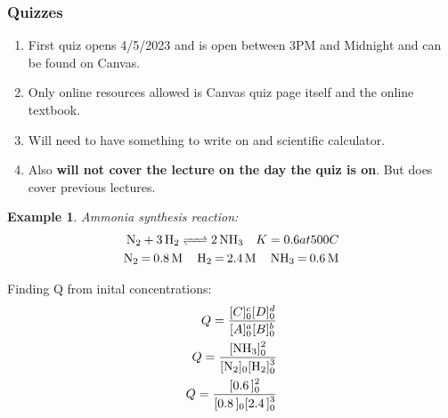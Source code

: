 \documentclass{article}  %
\newtheorem{exmp}{Example}
\begin{document}
\subsubsection*{Quizzes}
\begin{enumerate}
    \item First quiz opens 4/5/2023 and is open between 3PM and Midnight and can be found on Canvas.
    \item Only online resources allowed is Canvas quiz page itself and the online textbook.
    \item Will need to have something to write on and scientific calculator.
    \item Also \textbf{will not cover the lecture on the day the quiz is on}. But does cover previous lectures.
\end{enumerate}

\begin{exmp}
    Ammonia synthesis reaction: \\
    \begin{equation*}
        \begin{aligned}
            \ce{N2 + 3 H2 <=> 2 NH3} \quad K = 0.6 at 500C \\
            \ce{N2 = 0.8M \quad H2 = 2.4M \quad NH3 = 0.6M} \\        
        \end{aligned}
    \end{equation*}
\end{exmp}

Finding Q from inital concentrations:
\begin{equation*}
    \begin{aligned}
        Q = \frac{[C]^c_0[D]^d_0}{[A]^a_0[B]^b_0} \\
        Q = \ce{\frac{[NH3]^2_0}{[N2]_0[H2]^3_0}} \\
        Q = \ce{\frac{[0.6]^2_0}{[0.8]_0[2.4]^3_0}} \\
    \end{aligned}
\end{equation*}
\end{document}
